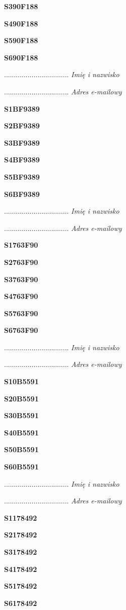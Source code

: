 \Large \textbf{S390F188}

\Large \textbf{S490F188}

\Large \textbf{S590F188}

\Large \textbf{S690F188}

.................................
\textit{Imię i nazwisko}

.................................
\textit{Adres e-mailowy}

\Large \textbf{S1BF9389}

\Large \textbf{S2BF9389}

\Large \textbf{S3BF9389}

\Large \textbf{S4BF9389}

\Large \textbf{S5BF9389}

\Large \textbf{S6BF9389}

.................................
\textit{Imię i nazwisko}

.................................
\textit{Adres e-mailowy}

\Large \textbf{S1763F90}

\Large \textbf{S2763F90}

\Large \textbf{S3763F90}

\Large \textbf{S4763F90}

\Large \textbf{S5763F90}

\Large \textbf{S6763F90}

.................................
\textit{Imię i nazwisko}

.................................
\textit{Adres e-mailowy}

\Large \textbf{S10B5591}

\Large \textbf{S20B5591}

\Large \textbf{S30B5591}

\Large \textbf{S40B5591}

\Large \textbf{S50B5591}

\Large \textbf{S60B5591}

.................................
\textit{Imię i nazwisko}

.................................
\textit{Adres e-mailowy}

\Large \textbf{S1178492}

\Large \textbf{S2178492}

\Large \textbf{S3178492}

\Large \textbf{S4178492}

\Large \textbf{S5178492}

\Large \textbf{S6178492}

